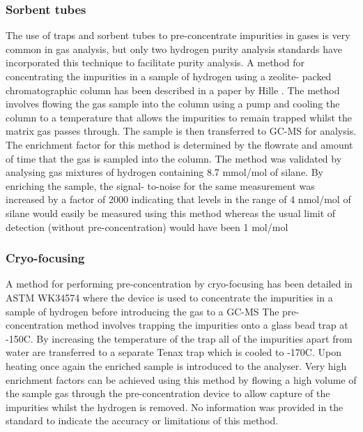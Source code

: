 \subsubsection{Sorbent tubes}
The use of traps and sorbent tubes to pre-concentrate impurities in gases is very common in gas analysis, 
but only two hydrogen purity analysis standards have incorporated this technique to facilitate purity analysis. 
A method for concentrating the impurities in a sample of hydrogen using a zeolite- packed chromatographic 
column has been described in a paper by Hille \cite{Hille1990a}. The method involves flowing the gas sample into the column 
using a pump and cooling the column to a temperature that allows the impurities to remain trapped whilst the 
matrix gas passes through. The sample is then transferred to GC-MS for analysis. The enrichment factor for 
this method is determined by the flowrate and amount of time that the gas is sampled into the column. 
The method was validated by analysing gas mixtures of hydrogen containing 8.7 mmol/mol of silane. 
By enriching the sample, the signal- to-noise for the same measurement was increased by a factor of 2000 
indicating that levels in the range of 4 nmol/mol of silane would easily be measured using this method 
whereas the usual limit of detection (without pre-concentration) would have been 1 \textmu mol/mol

\subsubsection{Cryo-focusing}
A method for performing pre-concentration by cryo-focusing has been detailed in ASTM WK34574 
where the device is used to concentrate the impurities in a sample of hydrogen before introducing 
the gas to a GC-MS \cite{Murugan2015} The pre-concentration method involves trapping the impurities onto a glass bead trap 
at -150\textdegree C. By increasing the temperature of the trap all of the impurities apart from water 
are transferred to a separate Tenax trap which is cooled to -170\textdegree C. 
Upon heating once again the enriched sample is introduced to the analyser. 
Very high enrichment factors can be achieved using this method by flowing a high volume of the sample 
gas through the pre-concentration device to allow capture of the impurities whilst the hydrogen is removed. 
No information was provided in the standard to indicate the accuracy or limitations of this method.

